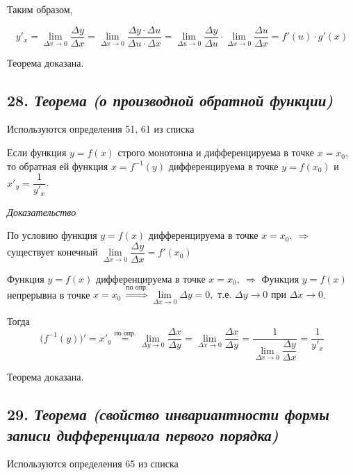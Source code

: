 Таким образом,

$$
y'_x=\lim\limits_{\Delta x \rightarrow 0}\dfrac{\Delta y}{\Delta x}=\lim\limits_{\Delta x \rightarrow 0}\dfrac{\Delta y\cdot \Delta u}{\Delta u \cdot \Delta x} = \lim\limits_{\Delta u \rightarrow 0}\dfrac{\Delta y}{\Delta u}\cdot \lim\limits_{\Delta x \rightarrow 0}\dfrac{\Delta u}{\Delta x} = f'(u)\cdot g'(x)
$$

Теорема доказана.
\newpage 
\subsection*{28. \textit{Теорема (о производной обратной функции)}}
\begin{Quote2} 
\small\centering 

Используются определения 51, 61 из списка \end{Quote2} 

Если функция $y = f(x)$ строго монотонна и дифференцируема в точке $x = x_0$, то обратная ей функция $x = f^{-1}(y)$ дифференцируема в точке $y = f(x_0)$ и $x'_y = {\dfrac{1}{y'_x}}$.
\vspace*{20pt} 

\textit{Доказательство}

По условию функция $y = f(x)$ дифференцируема в точке $x = x_0, \ \Rightarrow$ существует конечный $\lim\limits_{\Delta x \rightarrow 0}{\dfrac{\Delta y}{\Delta x}} = f'(x_0)$

Функция $y = f(x)$ дифференцируема в точке $x = x_0, \ \Rightarrow$ Функция $y = f(x)$ непрерывна в точке $x = x_0 \ \overset{\text{по опр.}}{\Rightarrow} \lim\limits_{\Delta x \rightarrow 0}\Delta y = 0, \text{ т.е. } \Delta y \rightarrow 0 \text{ при } \Delta x \rightarrow 0$.

Тогда $$
\big(f^{-1}(y)\big)' = x'_y \overset{\text{по опр.}}{=} \lim\limits_{\Delta y \rightarrow 0} {\dfrac{\Delta x}{\Delta y}}=\lim\limits_{\Delta x \rightarrow 0} {\dfrac{\Delta x}{\Delta y}} = \dfrac{1}{\lim\limits_{\Delta x \rightarrow 0} {\dfrac{\Delta y}{\Delta x}}} = \dfrac{1}{y'_x}
$$

Теорема доказана.
\newpage 
\subsection*{29. \textit{Теорема (свойство инвариантности формы записи дифференциала первого порядка)}}
\begin{Quote2} 
\small\centering 

Используются определения 65 из списка \end{Quote2} 

